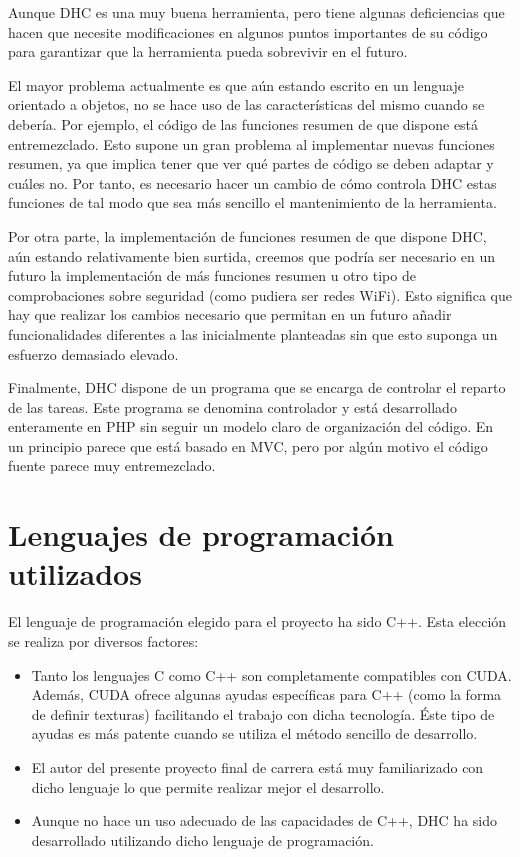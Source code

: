 Aunque DHC es una muy buena herramienta, pero tiene algunas deficiencias que hacen que necesite modificaciones en algunos puntos importantes de su código para garantizar que la herramienta pueda sobrevivir en el futuro.

El mayor problema actualmente es que aún estando escrito en un lenguaje orientado a objetos, no se hace uso de las características del mismo cuando se debería. Por ejemplo, el código de las funciones resumen de que dispone está entremezclado. Esto supone un gran problema al implementar nuevas funciones resumen, ya que implica tener que ver qué partes de código se deben adaptar y cuáles no. Por tanto, es necesario hacer un cambio de cómo controla DHC estas funciones de tal modo que sea más sencillo el mantenimiento de la herramienta.

Por otra parte, la implementación de funciones resumen de que dispone DHC, aún estando relativamente bien surtida, creemos que podría ser necesario en un futuro la implementación de más funciones resumen u otro tipo de comprobaciones sobre seguridad (como pudiera ser redes WiFi). Esto significa que hay que realizar los cambios necesario que permitan en un futuro añadir funcionalidades diferentes a las inicialmente planteadas sin que esto suponga un esfuerzo demasiado elevado.

Finalmente, DHC dispone de un programa que se encarga de controlar el reparto de las tareas. Este programa se denomina controlador y está desarrollado enteramente en PHP sin seguir un modelo claro de organización del código. En un principio parece que está basado en MVC, pero por algún motivo el código fuente parece muy entremezclado.

\section{Lenguajes de programación utilizados}

El lenguaje de programación elegido para el proyecto ha sido C++. Esta elección se realiza por diversos factores:

\begin{itemize}
	\item Tanto los lenguajes C como C++ son completamente compatibles con CUDA. Además, CUDA ofrece algunas ayudas específicas para C++ (como la forma de definir texturas) facilitando el trabajo con dicha tecnología. Éste tipo de ayudas es más patente cuando se utiliza el método sencillo de desarrollo.
	\item El autor del presente proyecto final de carrera está muy familiarizado con dicho lenguaje lo que permite realizar mejor el desarrollo.
	\item Aunque no hace un uso adecuado de las capacidades de C++, DHC ha sido desarrollado utilizando dicho lenguaje de programación.
\end{itemize}

